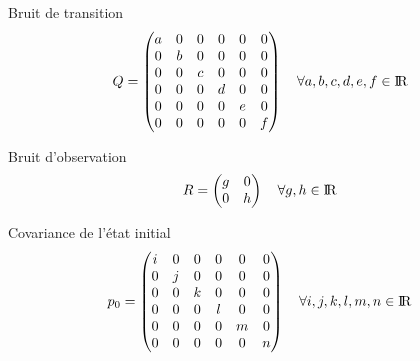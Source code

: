 Bruit de transition
\[ Q= \begin{pmatrix}
	a & 0 & 0 & 0 & 0 & 0 \\
	0 & b & 0 & 0 & 0 & 0 \\
	0 & 0 & c & 0 & 0 & 0 \\
	0 & 0 & 0 & d & 0 & 0 \\
	0 & 0 & 0 & 0 & e & 0 \\
	0 & 0 & 0 & 0 & 0 & f \\
\end{pmatrix} \quad \forall a,b,c,d,e,f \in {\rm I\!R} \]


Bruit d'observation
\[ R=\begin{pmatrix}
	g & 0 \\
	0 & h \\
\end{pmatrix} \quad \forall g,h \in {\rm I\!R} \]

Covariance de l'état initial
\[ p_0= \begin{pmatrix}
	i & 0 & 0 & 0 & 0 & 0 \\
	0 & j & 0 & 0 & 0 & 0 \\
	0 & 0 & k & 0 & 0 & 0 \\
	0 & 0 & 0 & l & 0 & 0 \\
	0 & 0 & 0 & 0 & m & 0 \\
	0 & 0 & 0 & 0 & 0 & n \\
\end{pmatrix} \quad \forall i,j,k,l,m,n \in {\rm I\!R} \]



